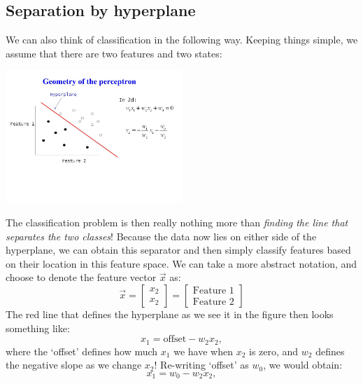 \documentclass{article}
\begin{document}
\subsection{Separation by hyperplane}
We can also think of classification in the following way. Keeping things simple, we assume that there are two features and two states:
    \begin{center}\includegraphics[width=0.5\textwidth,trim={0cm 6cm 10cm 3cm},clip]{perceptron_geometry.jpg}\end{center}
The classification problem is then really nothing more than \textit{finding the line that separates the two classes}! Because the data now lies on either side of the hyperplane, we can obtain this separator and then simply classify features based on their location in this feature space. We can take a more abstract notation, and choose to denote the feature vector $\vec{x}$ as:
\begin{equation}
    \vec{x} = \left[ \begin{array}{c} x_2 \\ x_2 \end{array}\right] = \left[ \begin{array}{c} \text{Feature 1} \\ \text{Feature 2} \end{array}\right]
\end{equation}
The red line that defines the hyperplane as we see it in the figure then looks something like:
\begin{equation}
    x_1 = \text{offset} - w_2x_2,
\end{equation}
where the `offset' defines how much $x_1$ we have when $x_2$ is zero, and $w_2$ defines the negative slope as we change $x_2$! Re-writing `offset' as $w_0$, we would obtain:
\begin{equation}
    x_1 = w_0 - w_2x_2,
\end{equation}
\end{document}
